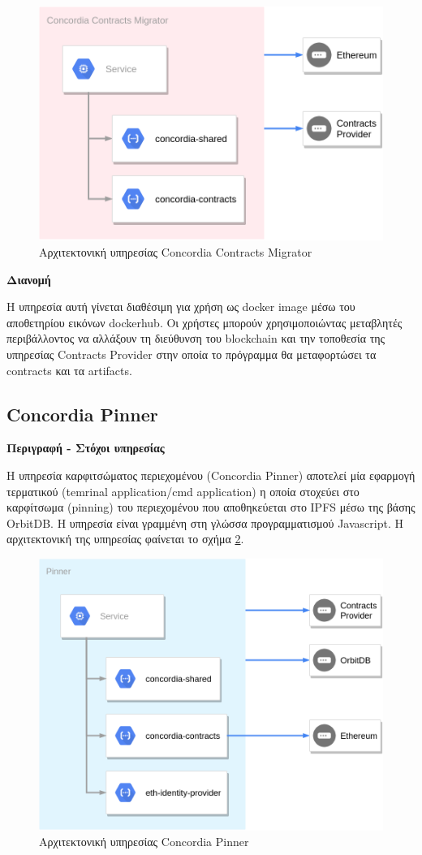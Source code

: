 \begin{figure}[H]
    \centering
    \includegraphics[width=.6\textwidth]{assets/figures/chapter-4/4.4.architecture-4.4.3.concordia-contracts-migrator-architecture.png}
    \caption{Αρχιτεκτονική υπηρεσίας Concordia Contracts Migrator}
    \label{figure:4-4-concordia-contracts-migrator-architecture}
\end{figure}

\vspace{0.5cm}
\textbf{Διανομή}

Η υπηρεσία αυτή γίνεται διαθέσιμη για χρήση ως docker image μέσω του αποθετηρίου εικόνων dockerhub. Οι χρήστες μπορούν χρησιμοποιώντας μεταβλητές περιβάλλοντος να αλλάξουν τη διεύθυνση του blockchain και την τοποθεσία της υπηρεσίας Contracts Provider στην οποία το πρόγραμμα θα μεταφορτώσει τα contracts και τα artifacts.

\subsection{Concordia Pinner} \label{subsection:4-4-concordia-pinner-service}

\vspace{0.5cm}
\textbf{Περιγραφή - Στόχοι υπηρεσίας}

Η υπηρεσία καρφιτσώματος περιεχομένου (Concordia Pinner) αποτελεί μία εφαρμογή τερματικού (temrinal application/cmd application) η οποία στοχεύει στο καρφίτσωμα (pinning) του περιεχομένου που αποθηκεύεται στο IPFS μέσω της βάσης OrbitDB. Η υπηρεσία είναι γραμμένη στη γλώσσα προγραμματισμού Javascript. Η αρχιτεκτονική της υπηρεσίας φαίνεται το σχήμα \ref{figure:4-4-concordia-pinner-architecture}.

\begin{figure}[H]
    \centering
    \includegraphics[width=.6\textwidth]{assets/figures/chapter-4/4.4.architecture-4.4.4.concordia-pinner-architecture.png}
    \caption{Αρχιτεκτονική υπηρεσίας Concordia Pinner}
    \label{figure:4-4-concordia-pinner-architecture}
\end{figure}

